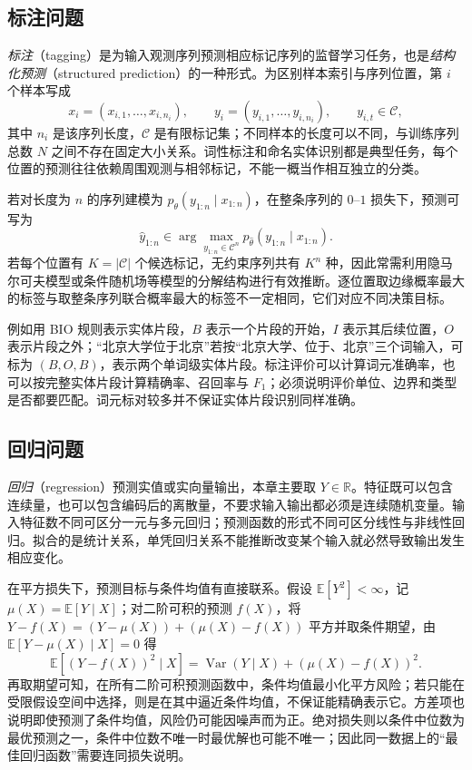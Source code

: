 \subsection{标注问题}
\label{subsec:lh-tagging}

\emph{标注}（tagging）是为输入观测序列预测相应标记序列的监督学习任务，也是\emph{结构化预测}（structured prediction）的一种形式。为区别样本索引与序列位置，第 $i$ 个样本写成
\[
    x_i=(x_{i,1},\ldots,x_{i,n_i}),
    \qquad
    y_i=(y_{i,1},\ldots,y_{i,n_i}),\qquad y_{i,t}\in\mathcal C,
\]
其中 $n_i$ 是该序列长度，$\mathcal C$ 是有限标记集；不同样本的长度可以不同，与训练序列总数 $N$ 之间不存在固定大小关系。词性标注和命名实体识别都是典型任务，每个位置的预测往往依赖周围观测与相邻标记，不能一概当作相互独立的分类。

若对长度为 $n$ 的序列建模为 $p_\theta(y_{1:n}\mid x_{1:n})$，在整条序列的 $0$--$1$ 损失下，预测可写为
\begin{equation}
    \widehat y_{1:n}\in\arg\max_{y_{1:n}\in\mathcal C^n}
        p_{\widehat\theta}(y_{1:n}\mid x_{1:n}).
    \label{eq:lh-sequence-decoding}
\end{equation}
若每个位置有 $K=|\mathcal C|$ 个候选标记，无约束序列共有 $K^n$ 种，因此常需利用隐马尔可夫模型或条件随机场等模型的分解结构进行有效推断。逐位置取边缘概率最大的标签与取整条序列联合概率最大的标签不一定相同，它们对应不同决策目标。

例如用 BIO 规则表示实体片段，$B$ 表示一个片段的开始，$I$ 表示其后续位置，$O$ 表示片段之外；“北京大学位于北京”若按“北京大学、位于、北京”三个词输入，可标为 $(B,O,B)$，表示两个单词级实体片段。标注评价可以计算词元准确率，也可以按完整实体片段计算精确率、召回率与 $F_1$；必须说明评价单位、边界和类型是否都要匹配。词元标对较多并不保证实体片段识别同样准确。

\subsection{回归问题}
\label{subsec:lh-regression}

\emph{回归}（regression）预测实值或实向量输出，本章主要取 $Y\in\mathbb R$。特征既可以包含连续量，也可以包含编码后的离散量，不要求输入输出都必须是连续随机变量。输入特征数不同可区分一元与多元回归；预测函数的形式不同可区分线性与非线性回归。拟合的是统计关系，单凭回归关系不能推断改变某个输入就必然导致输出发生相应变化。

在平方损失下，预测目标与条件均值有直接联系。假设 $\mathbb E[Y^2]<\infty$，记 $\mu(X)=\mathbb E[Y\mid X]$；对二阶可积的预测 $f(X)$，将 $Y-f(X)=(Y-\mu(X))+(\mu(X)-f(X))$ 平方并取条件期望，由 $\mathbb E[Y-\mu(X)\mid X]=0$ 得
\begin{equation}
    \mathbb E[(Y-f(X))^2\mid X]
       =\operatorname{Var}(Y\mid X)+(\mu(X)-f(X))^2.
    \label{eq:lh-regression-conditional-risk}
\end{equation}
再取期望可知，在所有二阶可积预测函数中，条件均值最小化平方风险；若只能在受限假设空间中选择，则是在其中逼近条件均值，不保证能精确表示它。方差项也说明即使预测了条件均值，风险仍可能因噪声而为正。绝对损失则以条件中位数为最优预测之一，条件中位数不唯一时最优解也可能不唯一；因此同一数据上的“最佳回归函数”需要连同损失说明。

